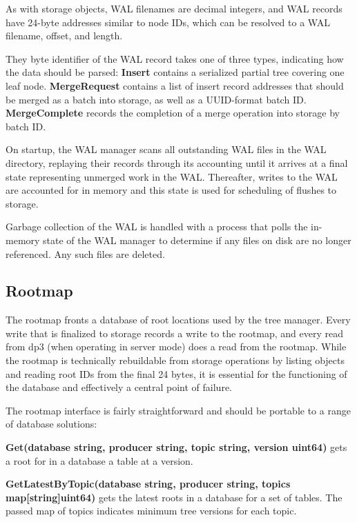 \documentclass[9pt,twocolumn]{article}
\begin{document}
    As with storage objects, WAL filenames are decimal integers, and WAL records
    have 24-byte addresses similar to node IDs, which can be resolved to a WAL
    filename, offset, and length.

    They byte identifier of the WAL record takes one of three types, indicating
    how the data should be parsed: \textbf{Insert} contains a serialized partial
    tree covering one leaf node.  \textbf{MergeRequest} contains a list of insert
    record addresses that should be merged as a batch into storage, as well as a
    UUID-format batch ID.  \textbf{MergeComplete} records the completion of a
    merge operation into storage by batch ID.

    On startup, the WAL manager scans all outstanding WAL files in the WAL
    directory, replaying their records through its accounting until it arrives at a
    final state representing unmerged work in the WAL. Thereafter, writes to the
    WAL are accounted for in memory and this state is used for scheduling of
    flushes to storage.

    Garbage collection of the WAL is handled with a process that polls the
    in-memory state of the WAL manager to determine if any files on disk are no
    longer referenced. Any such files are deleted.

    \subsection{Rootmap}
    The rootmap fronts a database of root locations used by the tree manager.
    Every write that is finalized to storage records a write to the rootmap,
    and every read from dp3 (when operating in server mode) does a read from
    the rootmap.  While the rootmap is technically rebuildable from storage
    operations by listing objects and reading root IDs from the final 24 bytes,
    it is essential for the functioning of the database and effectively a
    central point of failure.

    The rootmap interface is fairly straightforward and should be portable to a
    range of database solutions:

    \textbf{Get(database string, producer string, topic string, version uint64)}
    gets a root for in a database a table at a version.

    \textbf{GetLatestByTopic(database string, producer string, topics
    map[string]uint64)} gets the latest roots in a database for a set of tables.
    The passed map of topics indicates minimum tree versions for each topic.
\end{document}
